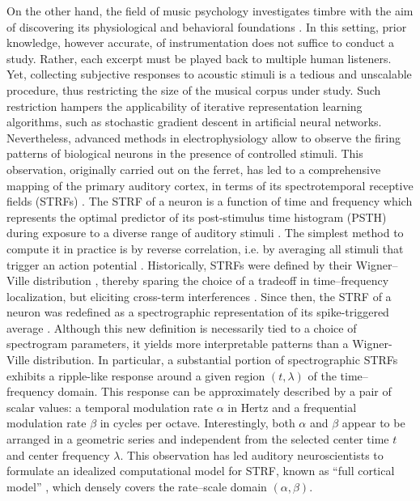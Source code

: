 \documentclass{bmcart}
\begin{document}
On the other hand, the field of music psychology investigates timbre with the aim of discovering its physiological and behavioral foundations \cite{mcadams2009chapter}.
In this setting, prior knowledge, however accurate, of instrumentation does not suffice to conduct a study.
Rather, each excerpt must be played back to multiple human listeners.
Yet, collecting subjective responses to acoustic stimuli is a tedious and unscalable procedure, thus restricting the size of the musical corpus under study.
Such restriction hampers the applicability of iterative representation learning algorithms, such as stochastic gradient descent in artificial neural networks.
Nevertheless, advanced methods in electrophysiology allow to observe the firing patterns of biological neurons in the presence of controlled stimuli.
This observation, originally carried out on the ferret, has led to a comprehensive mapping of the primary auditory cortex, in terms of its spectrotemporal receptive fields (STRFs) \cite{depireux2001jneur}.
The STRF of a neuron is a function of time and frequency which represents the optimal predictor of its post-stimulus time histogram (PSTH) during exposure to a diverse range of auditory stimuli \cite{aertsen1981biolcyb}.
The simplest method to compute it in practice is by reverse correlation, i.e. by averaging all stimuli that trigger an action potential \cite{deboer1968biomed}.
Historically, STRFs were defined by their Wigner--Ville distribution \cite{flandrin1998book}, thereby sparing the choice of a tradeoff in time--frequency localization, but eliciting cross-term interferences \cite{eggermont1993hearing}.
Since then, the STRF of a neuron was redefined as a spectrographic representation of its spike-triggered average \cite{klein2000compneur}.
Although this new definition is necessarily tied to a choice of spectrogram parameters, it yields more interpretable patterns than a Wigner-Ville distribution.
In particular, a substantial portion of spectrographic STRFs exhibits a ripple-like response around a given region $(t, \lambda)$ of the time--frequency domain.
This response can be approximately described by a pair of scalar values: a temporal modulation rate $\alpha$ in Hertz and a frequential modulation rate $\beta$ in cycles per octave.
Interestingly, both $\alpha$ and $\beta$ appear to be arranged in a geometric series and independent from the selected center time $t$ and center frequency $\lambda$.
This observation has led auditory neuroscientists to formulate an idealized computational model for STRF, known as ``full cortical model'' \cite{chi2005jasa}, which densely covers the rate--scale domain $(\alpha, \beta)$.
\end{document}
